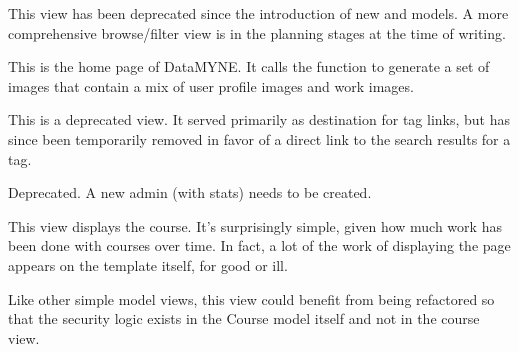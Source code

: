\documentclass[letterpaper,10pt,english]{sphinxmanual}
\begin{document}
\begin{fulllineitems}
\label{generated/apps.profiles.views:apps.profiles.views.filter}
This view has been deprecated since the introduction of new 
and  models.  A more comprehensive browse/filter view is in
the planning stages at the time of writing.

\end{fulllineitems}



\begin{fulllineitems}
\label{generated/apps.profiles.views:apps.profiles.views.home}
This is the home page of DataMYNE.  It calls the 
function to generate a set of images that contain a mix of user
profile images and work images.

\end{fulllineitems}



\begin{fulllineitems}
\label{generated/apps.profiles.views:apps.profiles.views.list_profiles}
This is a deprecated view.  It served primarily as destination for tag links, but has
since been temporarily removed in favor of a direct link to the search results for a tag.

\end{fulllineitems}



\begin{fulllineitems}
\label{generated/apps.profiles.views:apps.profiles.views.stats_report}
Deprecated.  A new admin (with stats) needs to be created.

\end{fulllineitems}



\begin{fulllineitems}
\label{generated/apps.profiles.views:apps.profiles.views.view_course}
This view displays the course.  It's surprisingly simple, given how much work has
been done with courses over time.  In fact, a lot of the work of displaying the
page appears on the template itself, for good or ill.

Like other simple model views, this view could benefit from being refactored so
that the security logic exists in the Course model itself and not in the course
view.

\end{fulllineitems}
\end{document}
